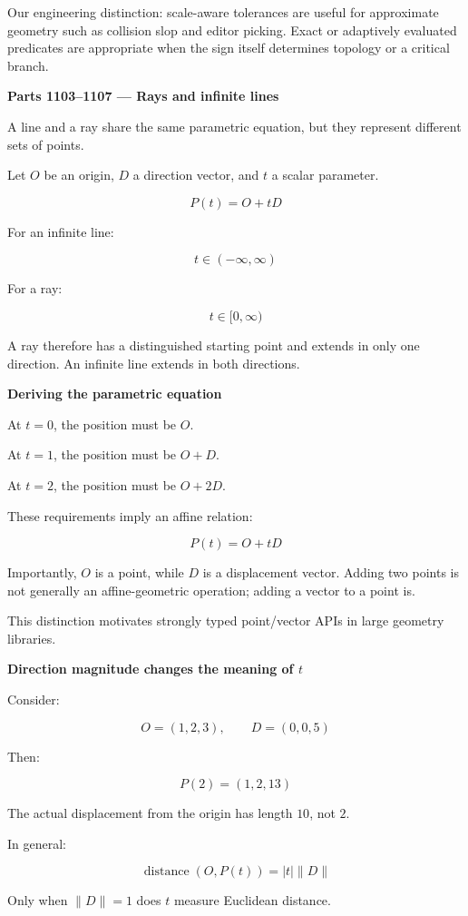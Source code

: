 Our engineering distinction: scale-aware tolerances are useful for approximate geometry such as collision slop and editor picking. Exact or adaptively evaluated predicates are appropriate when the sign itself determines topology or a critical branch.

\textbf{Parts 1103--1107 --- Rays and infinite lines}

A line and a ray share the same parametric equation, but they represent different sets of points.

Let \(O\) be an origin, \(D\) a direction vector, and \(t\) a scalar parameter.

\[
\boxed{P(t)=O+tD}
\]

For an infinite line:

\[
t\in(-\infty,\infty)
\]

For a ray:

\[
t\in[0,\infty)
\]

A ray therefore has a distinguished starting point and extends in only one direction. An infinite line extends in both directions.

\textbf{Deriving the parametric equation}

At \(t=0\), the position must be \(O\).

At \(t=1\), the position must be \(O+D\).

At \(t=2\), the position must be \(O+2D\).

These requirements imply an affine relation:

\[
P(t)=O+tD
\]

Importantly, \(O\) is a point, while \(D\) is a displacement vector. Adding two points is not generally an affine-geometric operation; adding a vector to a point is.

This distinction motivates strongly typed point/vector APIs in large geometry libraries.

\textbf{Direction magnitude changes the meaning of \(t\)}

Consider:

\[
O=(1,2,3),\qquad D=(0,0,5)
\]

Then:

\[
P(2)=(1,2,13)
\]

The actual displacement from the origin has length \(10\), not \(2\).

In general:

\[
\operatorname{distance}(O,P(t))=|t|\|D\|
\]

Only when \(\|D\|=1\) does \(t\) measure Euclidean distance.

